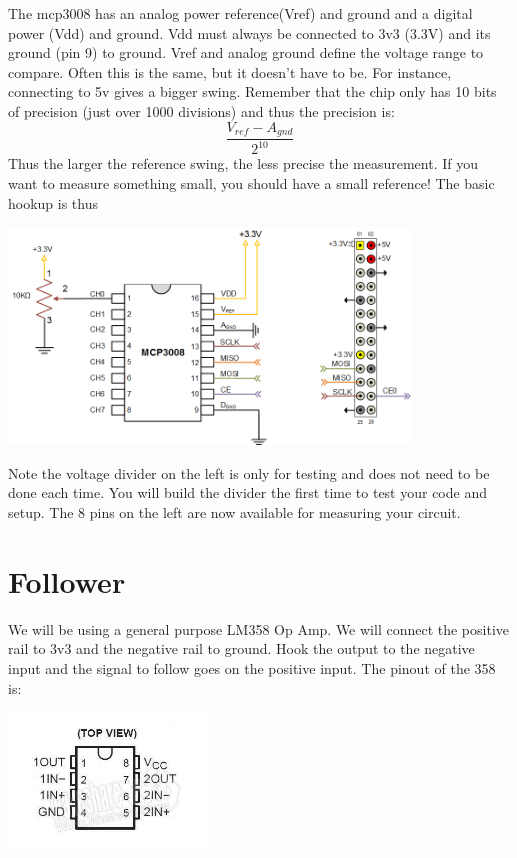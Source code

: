 

The mcp3008 has an analog power reference(Vref) and ground and a digital power (Vdd) and ground.  Vdd must always be connected to 3v3 (3.3V) and its ground (pin 9) to ground.  Vref and analog ground define the voltage range to compare.  Often this is the same, but it doesn't have to be.  For instance, connecting to 5v gives a bigger swing.  Remember that the chip only has 10 bits of precision (just over 1000 divisions) and thus the precision is:
$$
\frac{V_{ref}-A_{gnd}}{2^{10}}
$$
Thus the larger the reference swing, the less precise the measurement.  If you want to measure something small, you should have a small reference!  The basic hookup is thus

\includegraphics[width=0.8\textwidth]{../images/mcp3008_circuit.png}

Note the voltage divider on the left is only for testing and does not need to be done each time.  You will build the divider the first time to test your code and setup.  The 8 pins on the left are now available for measuring your circuit.

\section{Follower}

We will be using a general purpose LM358 Op Amp.  We will connect the positive rail to 3v3 and the negative rail to ground.  Hook the output to the negative input and the signal to follow goes on the positive input.  The pinout of the 358 is:

\includegraphics[width=0.4\textwidth]{../images/lm358.jpg}


